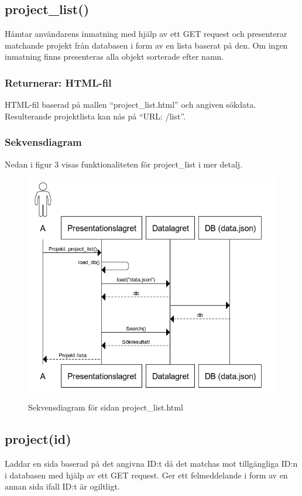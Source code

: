 \documentclass{TDP003mall}
\begin{document}
\newpage
\subsection{project\_list()}
Hämtar användarens inmatning med hjälp av ett GET request och presenterar matchande projekt från databasen i form av en lista baserat på den. Om ingen inmatning finns
presenteras alla objekt sorterade efter namn.
\subsubsection*{Returnerar: HTML-fil}
HTML-fil baserad på mallen ``project\_list.html'' och angiven sökdata. Resulterande projektlista kan nås på ``URL: /list''. 
\subsubsection*{Sekvensdiagram}
Nedan i figur 3 visas funktionaliteten för project\_list i mer detalj.
\begin{figure}[!h]
  \centering
  \includegraphics[scale=0.5]{projekt_lista.png}
  \label{Bild 3}
  \caption{Sekvensdiagram för sidan project\_list.html}
\end{figure}

\newpage
\subsection{project(id)}
Laddar en sida baserad på det angivna ID:t då det matchas mot tillgängliga ID:n i databasen med hjälp av ett GET request. Ger ett felmeddelande i form av en annan sida ifall ID:t är ogiltligt.
\end{document}
